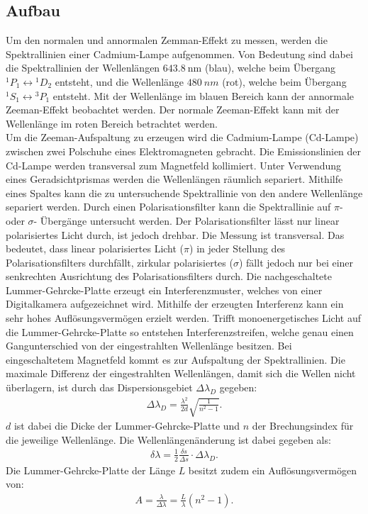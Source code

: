 \subsection{Aufbau}
Um den normalen und annormalen Zemman-Effekt zu messen, werden die Spektrallinien einer Cadmium-Lampe aufgenommen.
Von Bedeutung sind dabei die Spektrallinien der Wellenlängen $\SI{643.8}{\nano\meter}$ (blau), welche beim Übergang ${}^1P_1\leftrightarrow{}^1D_2$ entsteht, und
die Wellenlänge $\SI{480}{nm}$ (rot), welche beim Übergang ${}^1S_1\leftrightarrow{}^3P_1$ entsteht.
Mit der Wellenlänge im blauen Bereich kann der annormale Zeeman-Effekt beobachtet werden.
Der normale Zeeman-Effekt kann mit der Wellenlänge im roten Bereich betrachtet werden.\\
%
Um die Zeeman-Aufspaltung zu erzeugen wird die Cadmium-Lampe (Cd-Lampe) zwischen zwei Polschuhe eines Elektromagneten gebracht.
Die Emissionslinien der Cd-Lampe werden transversal zum Magnetfeld kollimiert.
Unter Verwendung eines Geradsichtprismas werden die Wellenlängen räumlich separiert.
Mithilfe eines Spaltes kann die zu untersuchende Spektrallinie von den andere Wellenlänge separiert werden.
Durch einen Polarisationsfilter kann die Spektrallinie auf $\pi$- oder $\sigma$- Übergänge untersucht werden.
Der Polarisationsfilter lässt nur linear polarisiertes Licht durch, ist jedoch drehbar.
Die Messung ist transversal.
Das bedeutet, dass linear polarisiertes Licht ($\pi$) in jeder Stellung des Polarisationsfilters durchfällt, zirkular polarisiertes ($\sigma$) fällt jedoch nur bei einer senkrechten Ausrichtung des Polarisationsfilters durch.
Die nachgeschaltete Lummer-Gehrcke-Platte erzeugt ein Interferenzmuster, welches von einer Digitalkamera aufgezeichnet wird.
Mithilfe der erzeugten Interferenz kann ein sehr hohes Auflösungsvermögen erzielt werden.
Trifft monoenergetisches Licht auf die Lummer-Gehrcke-Platte so entstehen Interferenzstreifen, welche genau einen Gangunterschied von der eingestrahlten Wellenlänge besitzen.
Bei eingeschaltetem Magnetfeld kommt es zur Aufspaltung der Spektrallinien.
Die maximale Differenz der eingestrahlten Wellenlängen, damit sich die Wellen nicht überlagern, ist durch das Dispersionsgebiet $\Delta \lambda_D$ gegeben:
\begin{align}
	\Delta \lambda_D =\frac{\lambda^2}{2d}\sqrt{\frac{1}{n^2-1}}.
	\label{eqn:dispersionsgebiet}
\end{align}
$d$ ist dabei die Dicke der Lummer-Gehrcke-Platte und $n$ der Brechungsindex für die jeweilige Wellenlänge.
Die Wellenlängenänderung ist dabei gegeben als:
\begin{align}
  \delta \lambda = \frac{1}{2}\frac{\delta s}{\Delta s}\cdot \Delta\lambda_D.
	\label{eqn:wellenlänge}
\end{align}
Die Lummer-Gehrcke-Platte der Länge $L$ besitzt zudem ein Auflösungsvermögen von:
\begin{align}
 A=\frac{\lambda}{\Delta\lambda}=\frac{L}{\lambda}(n^2-1).
 \label{eqn:auflösung}
\end{align}
\FloatBarrier


